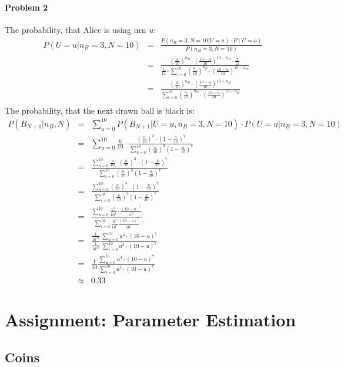 \documentclass{article}
\begin{document}
\paragraph*{Problem 2}
The probability, that Alice is using urn $u$:
\begin{eqnarray}
P(U = u | n_B = 3,N = 10) &=& \frac{P(n_B = 3, N = 10 | U = u) \cdot P(U = u)}{P(n_B = 3, N = 10)}\\
&=& \frac{	(\frac{u}{10})^{n_B} \cdot (\frac{10-u}{10})^{10-n_B}\cdot \frac{1}{11}}{\frac{1}{11} \cdot \sum_{i=0}^{10} (\frac{u_i}{10})^{n_B} \cdot (\frac{10-u}{10})^{10-n_B}}\\
&=& \frac{	(\frac{u}{10})^{n_B} \cdot (\frac{10-u}{10})^{10-n_B}}{\sum_{i=0}^{10} (\frac{u_i}{10})^{n_B} \cdot (\frac{10-u}{10})^{10-n_B}}\\
\end{eqnarray}
The probability, that the next drawn ball is black is:
\begin{eqnarray}
P(B_{N+1} | n_B, N) &=& \sum_{u=0}^{10} P(B_{N+1} | U=u,n_B = 3,N = 10) \cdot P(U=u | n_B = 3, N = 10)\\
&=& \sum_{u=0}^{10} \frac{u}{10} \cdot \frac{(\frac{u}{10})^3 \cdot (1-\frac{u}{10})^7}{\sum_{u=0}^{10}(\frac{u}{10})^3(1-\frac{u}{10})^7}\\
&=& \frac{\sum_{u=0}^{10} \frac{u}{10} \cdot (\frac{u}{10})^3 \cdot (1-\frac{u}{10})^7}{\sum_{i=0}^{10}(\frac{u}{10})^3(1-\frac{u}{10})^7}\\
&=& \frac{\sum_{u=0}^{10} (\frac{u}{10})^4 \cdot (1-\frac{u}{10})^7}{\sum_{i=0}^{10}(\frac{u}{10})^3(1-\frac{u}{10})^7}\\
&=& \frac{\sum_{u=0}^{10} \frac{u^4}{10^4} \cdot \frac{(10-u)^7}{10^7}}{\sum_{i=0}^{10} \frac{u^3}{10^3}\frac{(10-u)^7}{10^7}}\\
&=& \frac{\frac{1}{10^11}}{\frac{1}{10^10}} \frac{\sum_{u=0}^{10} u^4 \cdot (10-u)^7}{\sum_{i=0}^{10} u^3 \cdot (10-u)^7}\\
&=& \frac{1}{10} \frac{\sum_{u=0}^{10} u^4 \cdot (10-u)^7}{\sum_{i=0}^{10} u^3 \cdot (10-u)^7}\\
&\approx & 0.33 
\end{eqnarray}
\section{Assignment: Parameter Estimation}
\subsection{Coins}
\end{document}
